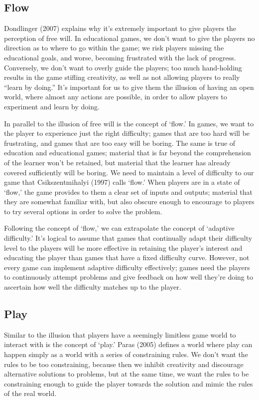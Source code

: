 \documentclass[12pt]{report}
\begin{document}
	\subsection{Flow}

		Dondlinger (2007) explains why it's extremely important to give players the perception of free will. In educational games, we don't want to give the players no direction as to where to go within the game; we risk players missing the educational goals, and worse, becoming frustrated with the lack of progress. Conversely, we don't want to overly guide the players; too much hand-holding results in the game stifling creativity, as well as not allowing players to really “learn by doing.” It's important for us to give them the illusion of having an open world, where almost any actions are possible, in order to allow players to experiment and learn by doing.

		In parallel to the illusion of free will is the concept of ‘flow.' In games, we want to the player to experience just the right difficulty; games that are too hard will be frustrating, and games that are too easy will be boring. The same is true of education and educational games; material that is far beyond the comprehension of the learner won't be retained, but material that the learner has already covered sufficiently will be boring. We need to maintain a level of difficulty to our game that Csikszentmihalyi (1997) calls ‘flow.' When players are in a state of ‘flow,' the game provides to them a clear set of inputs and outputs; material that they are somewhat familiar with, but also obscure enough to encourage to players to try several options in order to solve the problem.

		Following the concept of ‘flow,' we can extrapolate the concept of ‘adaptive difficulty.' It's logical to assume that games that continually adapt their difficulty level to the players will be more effective in retaining the player's interest and educating the player than games that have a fixed difficulty curve. However, not every game can implement adaptive difficulty effectively; games need the players to continuously attempt problems and give feedback on how well they're doing to ascertain how well the difficulty matches up to the player.

	\subsection{Play}

		Similar to the illusion that players have a seemingly limitless game world to interact with is the concept of ‘play.' Paras (2005) defines a world where play can happen simply as a world with a series of constraining rules. We don't want the rules to be too constraining, because then we inhibit creativity and discourage alternative solutions to problems, but at the same time, we want the rules to be constraining enough to guide the player towards the solution and mimic the rules of the real world.
		
\end{document}
